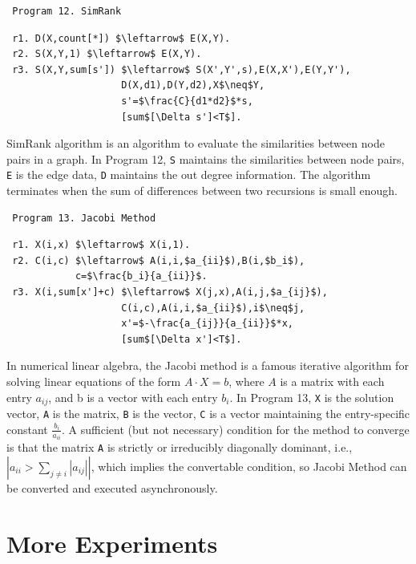 \begin{appendix}
 \begin{verbatim}
 Program 12. SimRank
 \end{verbatim}\small
 \begin{lstlisting}
 r1. D(X,count[*]) $\leftarrow$ E(X,Y).
 r2. S(X,Y,1) $\leftarrow$ E(X,Y).
 r3. S(X,Y,sum[s']) $\leftarrow$ S(X',Y',s),E(X,X'),E(Y,Y'),
                    D(X,d1),D(Y,d2),X$\neq$Y,
                    s'=$\frac{C}{d1*d2}$*s,
                    [sum$[\Delta s']<T$].
 \end{lstlisting}
 \normalsize
 
 SimRank algorithm \cite{Jeh:2002:SMS:775047.775126} is an algorithm to evaluate the similarities between node pairs in a graph. In Program 12, \texttt{S} maintains the similarities between node pairs, \texttt{E} is the edge data, \texttt{D} maintains the out degree information. The algorithm terminates when the sum of differences between two recursions is small enough.
 
 \begin{verbatim}
 Program 13. Jacobi Method
 \end{verbatim}\small
 \begin{lstlisting}
 r1. X(i,x) $\leftarrow$ X(i,1).
 r2. C(i,c) $\leftarrow$ A(i,i,$a_{ii}$),B(i,$b_i$),
            c=$\frac{b_i}{a_{ii}}$.
 r3. X(i,sum[x']+c) $\leftarrow$ X(j,x),A(i,j,$a_{ij}$),
                    C(i,c),A(i,i,$a_{ii}$),i$\neq$j,
                    x'=$-\frac{a_{ij}}{a_{ii}}$*x,
                    [sum$[\Delta x']<T$].
 \end{lstlisting}
 \normalsize
 
 In numerical linear algebra, the Jacobi method is a famous iterative algorithm for solving linear equations of the form $A\cdot X=b$, where $A$ is a matrix with each entry $a_{ij}$, and b is a vector with each entry $b_i$. In Program 13, \texttt{X} is the solution vector, \texttt{A} is the matrix, \texttt{B} is the vector, \texttt{C} is a vector maintaining the entry-specific constant $\frac{b_i}{a_{ii}}$. A sufficient (but not necessary) condition for the method to converge is that the matrix \texttt{A} is strictly or irreducibly diagonally dominant, i.e., $|a_{ii}>\sum_{j\neq i}{|a_{ij}|}|$, which implies the convertable condition, so Jacobi Method can be converted and executed asynchronously.
 
 
 \section{More Experiments}
 \label{sec:app:expr}


\end{appendix}

